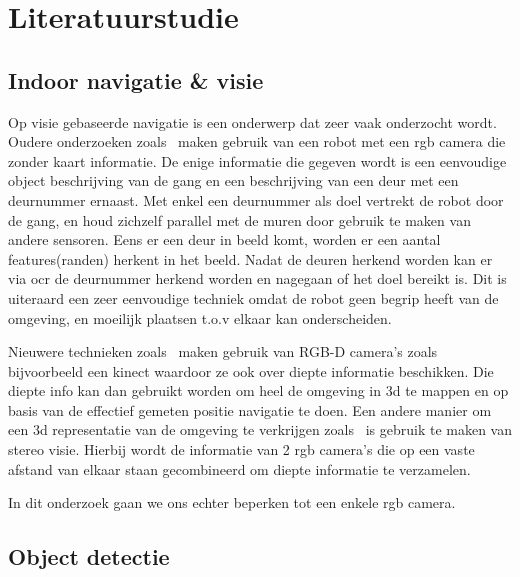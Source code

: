 
\chapter{Literatuurstudie}

    \section{Indoor navigatie \& visie}
        Op visie gebaseerde navigatie is een onderwerp dat zeer vaak onderzocht wordt. Oudere onderzoeken zoals~\cite{Tomono2000} maken gebruik van een robot met een \gls{rgb} camera die zonder kaart informatie.
        De enige informatie die gegeven wordt is een eenvoudige object beschrijving van de gang en een beschrijving van een deur met een deurnummer ernaast.
        Met enkel een deurnummer als doel vertrekt de robot door de gang, en houd zichzelf parallel met de muren door gebruik te maken van andere sensoren. Eens er een deur in beeld komt, worden er een aantal features(randen)
        herkent in het beeld. Nadat de deuren herkend worden kan er via \gls{ocr} de deurnummer herkend worden en nagegaan of het doel bereikt is. Dit is uiteraard een zeer eenvoudige techniek omdat de robot geen begrip heeft van de omgeving, en moeilijk plaatsen t.o.v elkaar kan onderscheiden.

        Nieuwere technieken zoals~\cite{Henry10rgb-dmapping} maken gebruik van RGB-D camera's zoals bijvoorbeeld een kinect waardoor ze ook over diepte informatie beschikken. Die diepte info kan dan gebruikt worden om heel
        de omgeving in 3d te mappen en op basis van de effectief gemeten positie navigatie te doen. Een andere manier om een 3d representatie van de omgeving te verkrijgen zoals~\cite{schmid2013} is gebruik te maken van stereo visie.
        Hierbij wordt de informatie van 2 \gls{rgb} camera's die op een vaste afstand van elkaar staan gecombineerd om diepte informatie te verzamelen.

        In dit onderzoek gaan we ons echter beperken tot een enkele \gls{rgb} camera.
        
    \section{Object detectie}

